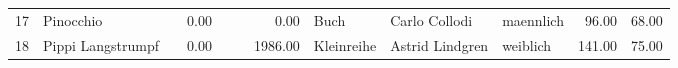 \begin{table}
\begin{center}
{\begin{tabular}{rllrllrlllrr}
  17 & Pinocchio                                                                                                                                                                                                                                                       &                                                                                                                                                                                                                                                                 & 0.00 &                                                                                                                                                                                                                                                                 &                                                                                                                                                                                                                                                                 & 0.00 & Buch & Carlo Collodi                                                                                                                                                                                                                                                   & maennlich & 96.00 & 68.00 \\ 
  18 & Pippi Langstrumpf                                                                                                                                                                                                                                               &                                                                                                                                                                                                                                                                 & 0.00 &                                                                                                                                                                                                                                                                 &                                                                                                                                                                                                                                                                 & 1986.00 & Kleinreihe & Astrid Lindgren                                                                                                                                                                                                                                                 & weiblich & 141.00 & 75.00 \\ 

\end{tabular}}
\end{center}
\end{table}

